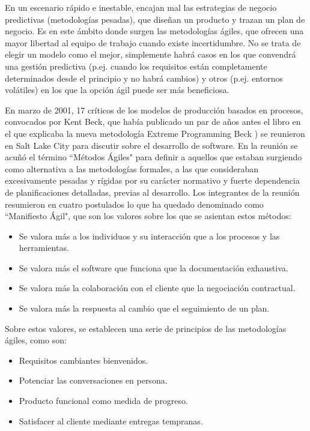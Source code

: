 En un escenario rápido e inestable, encajan mal las estrategias de negocio predictivas (metodologías pesadas), que diseñan un producto y trazan un plan de negocio. Es en este ámbito donde surgen las metodologías ágiles, que ofrecen una mayor libertad al equipo de trabajo cuando existe incertidumbre. No se trata de elegir un modelo como el mejor, simplemente habrá casos en los que convendrá una gestión predictiva (p.ej. cuando los requisitos están completamente determinados desde el principio y no habrá cambios) y otros (p.ej. entornos volátiles) en los que la opción ágil puede ser más beneficiosa.

En marzo de 2001, 17 críticos de los modelos de producción basados en procesos, convocados por Kent Beck, que había publicado un par de años antes el libro en el que explicaba la nueva metodología Extreme Programming Beck \cite{kent}) se reunieron en Salt Lake City para discutir sobre el desarrollo de software. En la reunión se acuñó el término ``Métodos Ágiles" para definir a aquellos que estaban surgiendo como alternativa a las metodologías formales, a las que consideraban excesivamente pesadas y rígidas por su carácter normativo y fuerte dependencia de planificaciones detalladas, previas al desarrollo. Los integrantes de la reunión resumieron en cuatro postulados lo que ha quedado denominado como ``Manifiesto Ágil", que son los valores sobre los que se asientan estos métodos:

\begin{itemize}
\item Se valora más a los individuos y su interacción que a los procesos y las herramientas.
\item Se valora más el software que funciona que la documentación exhaustiva.
\item Se valora más la colaboración con el cliente que la negociación contractual.
\item Se valora más la respuesta al cambio que el seguimiento de un plan.
\end{itemize}

\noindent
Sobre estos valores, se establecen una serie de principios de las metodologías ágiles, como son:

\begin{itemize}
\item Requisitos cambiantes bienvenidos.
\item Potenciar las conversaciones en persona.
\item Producto funcional como medida de progreso.
\item Satisfacer al cliente mediante entregas tempranas.
\end{itemize}

